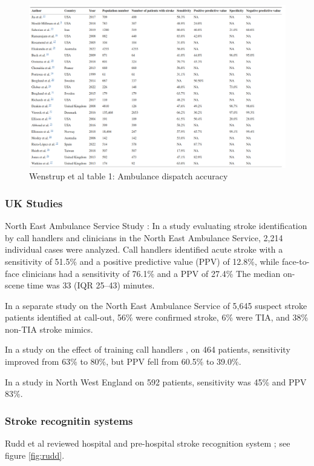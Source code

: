 \begin{figure}
    \centering
    \includegraphics[width=0.75\linewidth]{images_background/wenstrup.png}
    \caption{Wenstrup et al table 1: Ambulance dispatch accuracy}
    \label{fig:wenstrup}
\end{figure}

\subsubsection{UK Studies}

North East Ambulance Service Study \cite{mcclelland_ambulance_2021}: In a study evaluating stroke identification by call handlers and clinicians in the North East Ambulance Service, 2,214 individual cases were analyzed. Call handlers identified acute stroke with a sensitivity of 51.5\% and a positive predictive value (PPV) of 12.8\%, while face-to-face clinicians had a sensitivity of 76.1\% and a PPV of 27.4\% The median on-scene time was 33 (IQR 25–43) minutes.

In a separate study on the North East Ambulance Service \cite{mcclelland_positive_2020} of 5,645 suspect stroke patients identified at call-out, 56\% were confirmed stroke, 6\% were TIA, and 38\% non-TIA stroke mimics.

In a study on the effect of training call handlers \cite{watkins_training_2013}, on 464 patients, sensitivity improved from 63\% to 80\%, but PPV fell from 60.5\% to 39.0\%. 

In a study in North West England \cite{jones_identification_2013} on 592 patients, sensitivity was 45\% and PPV 83\%.

\subsubsection{Stroke recognitin systems}

Rudd et al reviewed hospital and pre-hospital stroke recognition system \cite{rudd_systematic_2016}; see figure \ref{fig:rudd}.

